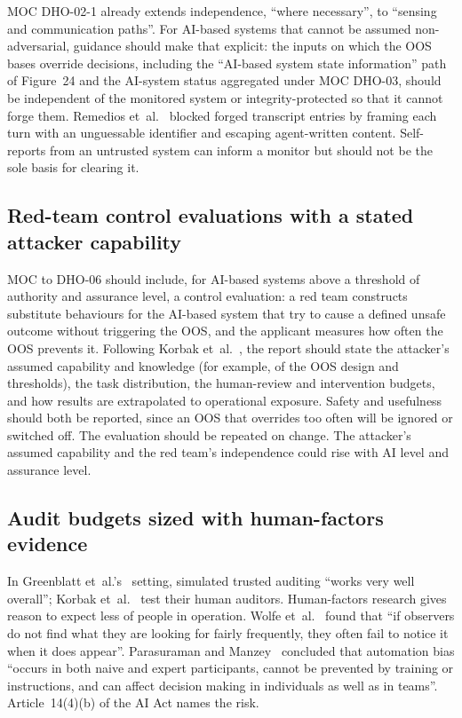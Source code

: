 \documentclass[11pt]{article}
\begin{document}
MOC DHO-02-1 already extends independence, ``where necessary'', to ``sensing and communication paths''. For AI-based systems that cannot be assumed non-adversarial, guidance should make that explicit: the inputs on which the OOS bases override decisions, including the ``AI-based system state information'' path of Figure~24 and the AI-system status aggregated under MOC DHO-03, should be independent of the monitored system or integrity-protected so that it cannot forge them. Remedios et~al.~\cite{remedios2026redteaming} blocked forged transcript entries by framing each turn with an unguessable identifier and escaping agent-written content. Self-reports from an untrusted system can inform a monitor but should not be the sole basis for clearing it.

\subsection{Red-team control evaluations with a stated attacker capability}\label{sec:redteam}

MOC to DHO-06 should include, for AI-based systems above a threshold of authority and assurance level, a control evaluation: a red team constructs substitute behaviours for the AI-based system that try to cause a defined unsafe outcome without triggering the OOS, and the applicant measures how often the OOS prevents it. Following Korbak et~al.~\cite{korbak2025sketch}, the report should state the attacker's assumed capability and knowledge (for example, of the OOS design and thresholds), the task distribution, the human-review and intervention budgets, and how results are extrapolated to operational exposure. Safety and usefulness should both be reported, since an OOS that overrides too often will be ignored or switched off. The evaluation should be repeated on change. The attacker's assumed capability and the red team's independence could rise with AI level and assurance level.

\subsection{Audit budgets sized with human-factors evidence}\label{sec:audit}

In Greenblatt et~al.'s~\cite{greenblatt2023control} setting, simulated trusted auditing ``works very well overall''; Korbak et~al.~\cite{korbak2025sketch} test their human auditors. Human-factors research gives reason to expect less of people in operation. Wolfe et~al.~\cite{wolfe2005rare} found that ``if observers do not find what they are looking for fairly frequently, they often fail to notice it when it does appear''. Parasuraman and Manzey~\cite{parasuraman2010complacency} concluded that automation bias ``occurs in both naive and expert participants, cannot be prevented by training or instructions, and can affect decision making in individuals as well as in teams''. Article~14(4)(b) of the AI Act names the risk.
\end{document}
